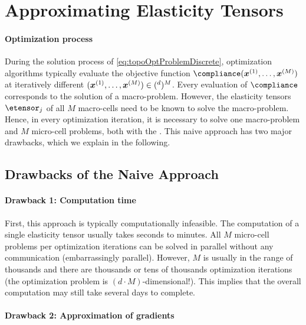 \section{Approximating Elasticity Tensors}
\label{sec:62tensors}

\paragraph{Optimization process}

During the solution process of \eqref{eq:topoOptProblemDiscrete},
optimization algorithms typically
evaluate the objective function $\compliance(\*x^{(1)}, \dotsc, \*x^{(M)})$
at iteratively different 
$(\*x^{(1)}, \dotsc, \*x^{(M)}) \in (\real^d)^M$.
Every evaluation of $\compliance$ corresponds to the solution of a
macro-problem.
However, the elasticity tensors $\etensor_j$ of all $M$ macro-cells
need to be known to solve the macro-problem.
Hence, in every optimization iteration, it is necessary to solve
one macro-problem and $M$ micro-cell problems,
both with the \fem.
This naive approach has two major drawbacks, which we explain in
the following.



\subsection{Drawbacks of the Naive Approach}
\label{sec:621drawbacks}

\paragraph{Drawback 1: Computation time}

First, this approach is typically computationally infeasible.
The computation of a single elasticity tensor usually takes seconds to
minutes.
All $M$ micro-cell problems per optimization iterations
can be solved in parallel without any
communication (embarrassingly parallel).
However, $M$ is usually in the range of thousands and
there are thousands or tens of thousands optimization iterations
(the optimization problem is $(d \cdot M)$-dimensional!).
This implies that the overall computation may still take
several days to complete.

\paragraph{Drawback 2: Approximation of gradients}

